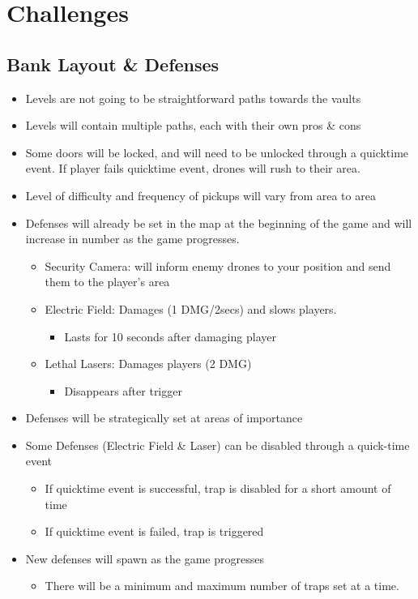 \documentclass[10pt]{report}
\begin{document}
\section{Challenges}    

\subsection{Bank Layout \& Defenses}

\begin{itemize}
    \item Levels are not going to be straightforward paths towards the vaults
    \item Levels will contain multiple paths, each with their own pros \& cons
    \item Some doors will be locked, and will need to be unlocked through a quicktime event. If player fails quicktime event, drones will rush to their area.
    \item Level of difficulty and frequency of pickups will vary from area to area
    \item Defenses will already be set in the map at the beginning of the game and will increase in number as the game progresses.
    \begin{itemize}
        \item Security Camera: will inform enemy drones to your position and send them to the player’s area
        \item Electric Field: Damages (1 DMG/2secs)  and slows players.
        \begin{itemize}
            \item Lasts for 10 seconds after damaging player
        \end{itemize}
        \item Lethal Lasers: Damages players (2 DMG)
        \begin{itemize}
            \item Disappears after trigger
        \end{itemize}
    \end{itemize}
    \item Defenses will be strategically set at areas of importance
    \item Some Defenses (Electric Field \& Laser) can be disabled through a quick-time event
    \begin{itemize}
        \item If quicktime event is successful, trap is disabled for a short amount of time
        \item If quicktime event is failed, trap is triggered
    \end{itemize}
    \item New defenses will spawn as the game progresses
    \begin{itemize}
        \item There will be a minimum and maximum number of traps set at a time.
    \end{itemize}
\end{itemize}
\end{document}
